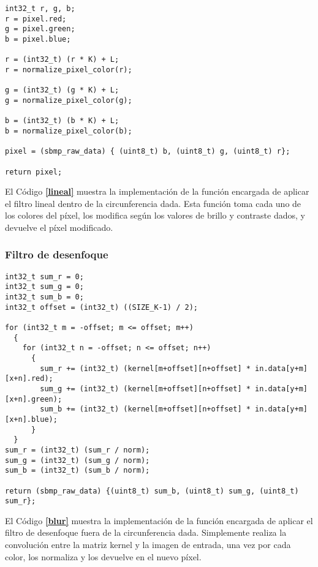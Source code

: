 \documentclass[12pt,a4paper]{article}
\begin{document}
\begin{lstlisting}[caption={Función `\emph{lineal\_filter}'.}, label={lineal}, language=Ce]
int32_t r, g, b;
r = pixel.red;
g = pixel.green;
b = pixel.blue;

r = (int32_t) (r * K) + L;
r = normalize_pixel_color(r);

g = (int32_t) (g * K) + L;
g = normalize_pixel_color(g);

b = (int32_t) (b * K) + L;
b = normalize_pixel_color(b);

pixel = (sbmp_raw_data) { (uint8_t) b, (uint8_t) g, (uint8_t) r};

return pixel;
\end{lstlisting}

El Código \textbf{\ref{lineal}} muestra la implementación de la función
encargada de aplicar el filtro lineal dentro de la circunferencia dada. Esta
función toma cada uno de los colores del píxel, los modifica según los valores
de brillo y contraste dados, y devuelve el píxel modificado.

\subsubsection{Filtro de desenfoque}
\label{blurf}

\begin{lstlisting}[caption={Función `\emph{blur\_filter}'.}, label={blur}, language=Ce]
int32_t sum_r = 0;
int32_t sum_g = 0;
int32_t sum_b = 0;
int32_t offset = (int32_t) ((SIZE_K-1) / 2);

for (int32_t m = -offset; m <= offset; m++)
  {
    for (int32_t n = -offset; n <= offset; n++)
      {
        sum_r += (int32_t) (kernel[m+offset][n+offset] * in.data[y+m][x+n].red);
        sum_g += (int32_t) (kernel[m+offset][n+offset] * in.data[y+m][x+n].green);
        sum_b += (int32_t) (kernel[m+offset][n+offset] * in.data[y+m][x+n].blue);
      }
  }
sum_r = (int32_t) (sum_r / norm);
sum_g = (int32_t) (sum_g / norm);
sum_b = (int32_t) (sum_b / norm);

return (sbmp_raw_data) {(uint8_t) sum_b, (uint8_t) sum_g, (uint8_t) sum_r};
\end{lstlisting}

El Código \textbf{\ref{blur}} muestra la implementación de la función
encargada de aplicar el filtro de desenfoque fuera de la circunferencia dada.
Simplemente realiza la convolución entre la matriz kernel y la imagen de entrada,
una vez por cada color, los normaliza y los devuelve en el nuevo píxel.
\end{document}
